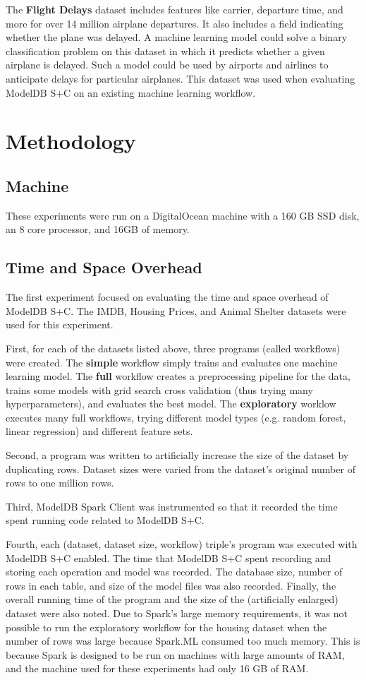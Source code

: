 The \textbf{Flight Delays} dataset \cite{airline} includes features like carrier, departure
time, and more for over 14 million airplane departures. It also includes a field indicating whether
the plane was delayed. A machine learning model could solve a binary classification problem on this dataset in which
it predicts whether a given airplane is delayed. Such a model could be used by airports and airlines
to anticipate delays for particular airplanes. This dataset was used when evaluating ModelDB S+C
on an existing machine learning workflow.

\section{Methodology}
\subsection{Machine}
These experiments were run on a DigitalOcean machine with a 160 GB SSD disk, an 8 core processor,
and 16GB of memory.

\subsection{Time and Space Overhead}
The first experiment focused on evaluating the time and space overhead of ModelDB S+C.
The IMDB, Housing Prices, and Animal Shelter datasets were used for this experiment. 

First, for each of the datasets listed above, three programs (called workflows) were
created. The \textbf{simple} workflow simply trains and evaluates one machine learning model. 
The \textbf{full} workflow creates a preprocessing pipeline for the data, trains 
some models with grid search cross validation (thus trying many hyperparameters), 
and evaluates the best model. The \textbf{exploratory} worklow executes many full workflows, 
trying different model types (e.g. random forest, linear regression) and different feature sets.

Second, a program was written to artificially increase the size of the dataset by duplicating rows.
Dataset sizes were varied from the dataset's original number of rows to one million rows.

Third, ModelDB Spark Client was instrumented so that it recorded the time spent running code related
to ModelDB S+C.

Fourth, each (dataset, dataset size, workflow) triple's program was executed with ModelDB S+C enabled. The time that ModelDB S+C spent
recording and storing each operation and model was recorded. The database size, number of rows in each table, and size of the model
files was also recorded. Finally, the overall running time of the program and the size of the (artificially enlarged) dataset
were also noted. Due to Spark's large memory requirements, it was not possible to run the exploratory workflow for the 
housing dataset when the number of rows was large because Spark.ML consumed too much memory. This is because Spark is designed
to be run on machines with large amounts of RAM, and the machine used for these experiments had only 16 GB of RAM.

